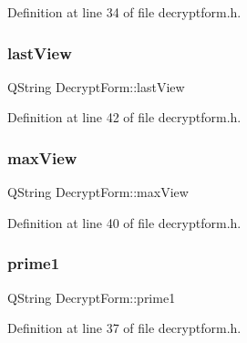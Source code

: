 Definition at line 34 of file decryptform.\+h.

\hypertarget{class_decrypt_form_a64370269794155fc85fafa42a1d31913}{}\label{class_decrypt_form_a64370269794155fc85fafa42a1d31913} 
\subsubsection{\texorpdfstring{last\+View}{lastView}}
{\footnotesize\ttfamily Q\+String Decrypt\+Form\+::last\+View\hspace{0.3cm}{\ttfamily [protected]}}



Definition at line 42 of file decryptform.\+h.

\hypertarget{class_decrypt_form_ada58fe6ec6a6c8204e30dfdbb9e55bbe}{}\label{class_decrypt_form_ada58fe6ec6a6c8204e30dfdbb9e55bbe} 
\subsubsection{\texorpdfstring{max\+View}{maxView}}
{\footnotesize\ttfamily Q\+String Decrypt\+Form\+::max\+View\hspace{0.3cm}{\ttfamily [protected]}}



Definition at line 40 of file decryptform.\+h.

\hypertarget{class_decrypt_form_a2a575d06f53701521157379069b573f0}{}\label{class_decrypt_form_a2a575d06f53701521157379069b573f0} 
\subsubsection{\texorpdfstring{prime1}{prime1}}
{\footnotesize\ttfamily Q\+String Decrypt\+Form\+::prime1\hspace{0.3cm}{\ttfamily [protected]}}



Definition at line 37 of file decryptform.\+h.

\hypertarget{class_decrypt_form_ac9b5eaa528b2826f3926e410e6ffa967}{}\label{class_decrypt_form_ac9b5eaa528b2826f3926e410e6ffa967} 
